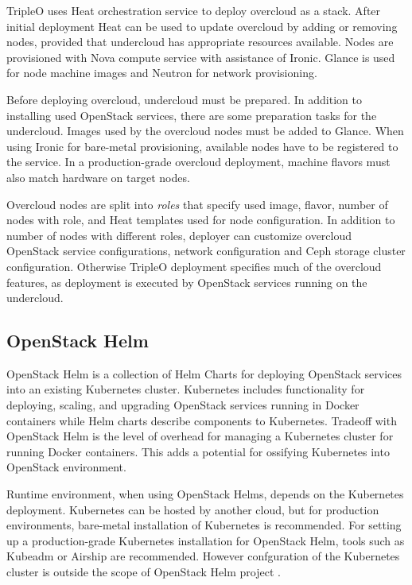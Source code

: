 TripleO uses Heat orchestration service to deploy overcloud as a stack. After
initial deployment Heat can be used to update overcloud by adding or removing
nodes, provided that undercloud has appropriate resources available. Nodes are
provisioned with Nova compute service with assistance of Ironic. Glance is used
for node machine images and Neutron for network provisioning.

Before deploying overcloud, undercloud must be prepared. In addition to
installing used OpenStack services, there are some preparation tasks for the
undercloud. Images used by the overcloud nodes must be added to Glance. When
using Ironic for bare-metal provisioning, available nodes have to be registered
to the service. In a production-grade overcloud deployment, machine flavors
must also match hardware on target nodes.

Overcloud nodes are split into \textit{roles} that specify used image, flavor,
number of nodes with role, and Heat templates used for node configuration. In
addition to number of nodes with different roles, deployer can customize
overcloud OpenStack service configurations, network configuration and Ceph
storage cluster configuration. Otherwise TripleO deployment specifies much of
the overcloud features, as deployment is executed by OpenStack services running
on the undercloud.

\subsection{OpenStack Helm}

OpenStack Helm \cite{openstack-helm} is a collection of Helm Charts for
deploying OpenStack services into an existing Kubernetes cluster. Kubernetes
includes functionality for deploying, scaling, and upgrading OpenStack services
running in Docker containers while Helm charts describe components to
Kubernetes. Tradeoff with OpenStack Helm is the level of overhead for managing
a Kubernetes cluster for running Docker containers. This adds a potential for
ossifying Kubernetes into OpenStack environment.

Runtime environment, when using OpenStack Helms, depends on the Kubernetes
deployment. Kubernetes can be hosted by another cloud, but for production
environments, bare-metal installation of Kubernetes is recommended. For setting
up a production-grade Kubernetes installation for OpenStack Helm, tools such as
Kubeadm or Airship \cite{airship} are recommended. However confguration of the
Kubernetes cluster is outside the scope of OpenStack Helm project
\cite{openstack-helm}.

